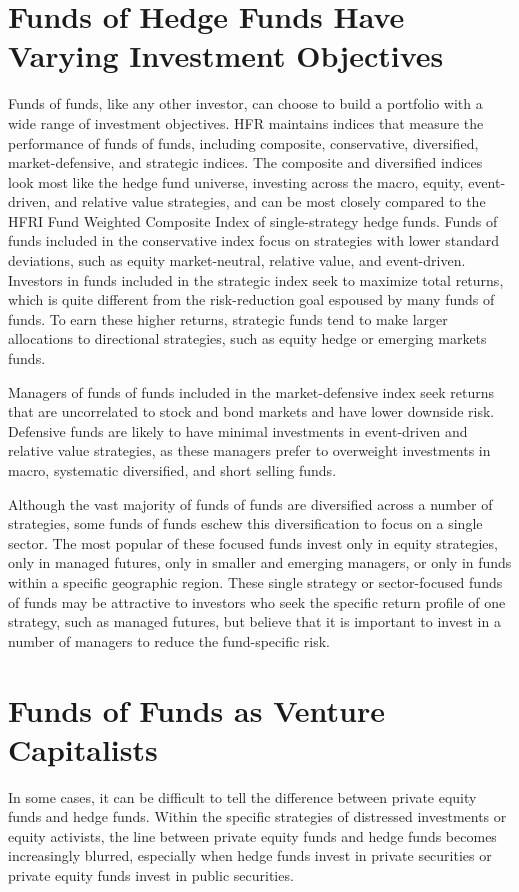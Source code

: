 \documentclass[11pt]{article}
\begin{document}
\section*{Funds of Hedge Funds Have Varying Investment Objectives}
Funds of funds, like any other investor, can choose to build a portfolio with a wide range of investment objectives. HFR maintains indices that measure the performance of funds of funds, including composite, conservative, diversified, market-defensive, and strategic indices. The composite and diversified indices look most like the hedge fund universe, investing across the macro, equity, event-driven, and relative value strategies, and can be most closely compared to the HFRI Fund Weighted Composite Index of single-strategy hedge funds. Funds of funds included in the conservative index focus on strategies with lower standard deviations, such as equity market-neutral, relative value, and event-driven. Investors in funds included in the strategic index seek to maximize total returns, which is quite different from the risk-reduction goal espoused by many funds of funds. To earn these higher returns, strategic funds tend to make larger allocations to directional strategies, such as equity hedge or emerging markets funds.

Managers of funds of funds included in the market-defensive index seek returns that are uncorrelated to stock and bond markets and have lower downside risk. Defensive funds are likely to have minimal investments in event-driven and relative value strategies, as these managers prefer to overweight investments in macro, systematic diversified, and short selling funds.

Although the vast majority of funds of funds are diversified across a number of strategies, some funds of funds eschew this diversification to focus on a single sector. The most popular of these focused funds invest only in equity strategies, only in managed futures, only in smaller and emerging managers, or only in funds within a specific geographic region. These single strategy or sector-focused funds of funds may be attractive to investors who seek the specific return profile of one strategy, such as managed futures, but believe that it is important to invest in a number of managers to reduce the fund-specific risk.

\section*{Funds of Funds as Venture Capitalists}
In some cases, it can be difficult to tell the difference between private equity funds and hedge funds. Within the specific strategies of distressed investments or equity activists, the line between private equity funds and hedge funds becomes increasingly blurred, especially when hedge funds invest in private securities or private equity funds invest in public securities.
\end{document}
